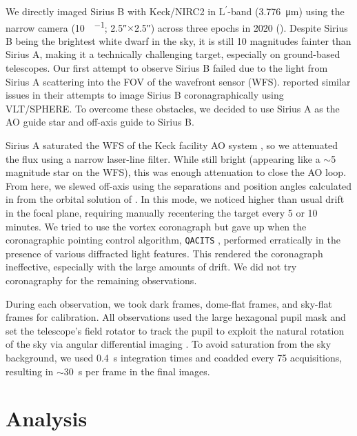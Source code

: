 \documentclass[twocolumn,linenumbers]{aastex631}
\newcommand\Lp{$\mathrm{L}^\prime$}
\begin{document}
We directly imaged Sirius B with Keck/NIRC2 in \Lp-band (\qty{3.776}{\micro\meter}) using the narrow camera (\qty{10}{\milliarcsecond\per\pixel}; \ang{;;2.5}$\times$\ang{;;2.5}) across three epochs in 2020 (). Despite Sirius B being the brightest white dwarf in the sky, it is still 10 magnitudes fainter than Sirius A, making it a technically challenging target, especially on ground-based telescopes. Our first attempt to observe Sirius B failed due to the light from Sirius A scattering into the FOV of the wavefront sensor (WFS). \citet[Sec.~2]{viganHighcontrastImagingSirius2015} reported similar issues in their attempts to image Sirius B coronagraphically using VLT/SPHERE. To overcome these obstacles, we decided to use Sirius A as the AO guide star and off-axis guide to Sirius B.

Sirius A saturated the WFS of the Keck facility AO system \citep{wizinowichPerformanceKeckObservatory2000}, so we attenuated the flux using a narrow laser-line filter. While still bright (appearing like a $\sim$5 magnitude star on the WFS), this was enough attenuation to close the AO loop. From here, we slewed off-axis using the separations and position angles calculated in  from the orbital solution of \citet{bondSiriusSystemIts2017}. In this mode, we noticed higher than usual drift in the focal plane, requiring manually recentering the target every 5 or 10 minutes. We tried to use the vortex coronagraph \citep{serabynKeckObservatoryInfrared2017} but gave up when the coronagraphic pointing control algorithm, \texttt{QACITS} \citep{hubyOnskyPerformanceQACITS2017a}, performed erratically in the presence of various diffracted light features. This rendered the coronagraph ineffective, especially with the large amounts of drift. We did not try coronagraphy for the remaining observations.

During each observation, we took dark frames, dome-flat frames, and sky-flat frames for calibration. All observations used the large hexagonal pupil mask and set the telescope's field rotator to track the pupil to exploit the natural rotation of the sky via angular differential imaging \citep[ADI;][]{maroisAngularDifferentialImaging2006}. To avoid saturation from the sky background, we used \qty{0.4}{\second} integration times and coadded every \num{75} acquisitions, resulting in $\sim$\qty{30}{\second} per frame in the final images.

\section{Analysis}\label{sec:analysis}
\end{document}
